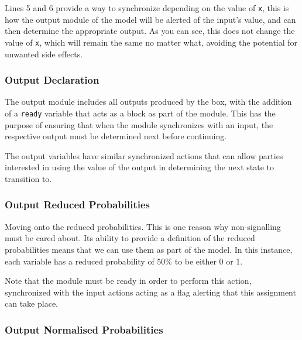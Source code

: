 \documentclass[report.tex]{subfiles}
\begin{document}
Lines 5 and 6 provide a way to synchronize depending on the value of \texttt{x},
this is how the output module of the model will be alerted of the input's value,
and can then determine the appropriate output. As you can see, this does not
change the value of \texttt{x}, which will remain the same no matter what,
avoiding the potential for unwanted side effects.

\subsubsection{Output Declaration} %
\label{ssub:output_declaration}
 

The output module includes all outputs produced by the box, with the addition of
a \texttt{ready} variable that acts as a block as part of the module. This has
the purpose of ensuring that when the module synchronizes with an input, the
respective output must be determined next before continuing. 

The output variables have similar synchronized actions that can allow parties 
interested in using the value of the output in determining the next state to
transition to.

\subsubsection{Output Reduced Probabilities} %
\label{ssub:output_reduced_probabilities}
 

Moving onto the reduced probabilities. This is one reason why non-signalling
must be cared about. Its ability to provide a definition of the reduced
probabilities means that we can use them as part of the model. In this instance,
each variable has a reduced probability of 50\% to be either 0 or 1. 

Note that the module must be ready in order to perform this action, synchronized
with the input actions acting as a flag alerting that this assignment can take
place.

\subsubsection{Output Normalised Probabilities} %
\label{ssub:output_normalised_probabilities}
 
\end{document}
